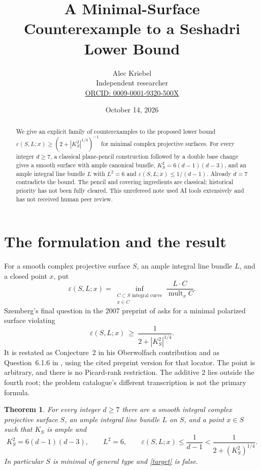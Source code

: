 \documentclass[11pt]{article}
\title{A Minimal-Surface Counterexample to a Seshadri Lower Bound}
\author{Alec Kriebel\\\small Independent researcher\\
\small\href{https://orcid.org/0009-0001-9320-500X}{ORCID: 0009-0001-9320-500X}}
\date{October 14, 2026}
\newtheorem{theorem}{Theorem}
\newcommand{\eps}{\varepsilon}
\begin{document}
\maketitle
\begin{abstract}
We give an explicit family of counterexamples to the proposed lower bound
$\eps(S,L;x)\ge (2+|K_S^2|^{1/4})^{-1}$ for minimal complex projective
surfaces. For every integer $d\ge7$, a classical plane-pencil construction
followed by a double base change gives a smooth surface with ample canonical
bundle, $K_S^2=6(d-1)(d-3)$, and an ample integral line bundle $L$ with
$L^2=6$ and $\eps(S,L;x)\le1/(d-1)$. Already $d=7$ contradicts the bound.
The pencil and covering ingredients are classical; historical priority has
not been fully cleared. This unrefereed note used AI tools extensively and
has not received human peer review.
\end{abstract}

\section{The formulation and the result}
For a smooth complex projective surface $S$, an ample integral line bundle
$L$, and a closed point $x$, put
\[
 \eps(S,L;x)=\inf_{\substack{C\subset S\text{ integral curve}\\x\in C}}
                 \frac{L\cdot C}{\operatorname{mult}_x C}.
\]
Szemberg's final question in the 2007 preprint of \cite{Szemberg} asks for a
minimal polarized surface violating
\begin{equation}\label{target}
 \eps(S,L;x)\ \ge\ \frac{1}{2+|K_S^2|^{1/4}}.
\end{equation}
It is restated as Conjecture~2 in his Oberwolfach contribution
\cite[p.~1124]{OWR} and as Question~6.1.6 in \cite[p.~17]{Primer}, using the
cited preprint version for that locator. The point is arbitrary, and there
is no Picard-rank restriction. The additive $2$ lies outside the fourth
root; the problem catalogue's different transcription is not the primary
formula.

\begin{theorem}\label{main}
For every integer $d\ge7$ there are a smooth integral complex projective
surface $S$, an ample integral line bundle $L$ on $S$, and a point $x\in S$
such that $K_S$ is ample and
\[
 K_S^2=6(d-1)(d-3),\qquad L^2=6,\qquad
 \eps(S,L;x)\le\frac1{d-1}
       <\frac1{2+(K_S^2)^{1/4}}.
\]
In particular $S$ is minimal of general type and \eqref{target} is false.
\end{theorem}
\end{document}
